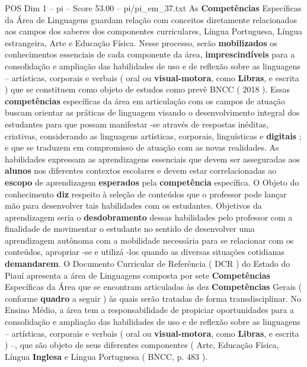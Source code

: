 \begin{textsample}{POS Dim 1 – pi – Score 53.00 – pi/pi\_em\_37.txt}
As \textbf{Competências} Específicas da Área de Linguagens guardam relação com conceitos diretamente relacionados aos campos dos saberes dos componentes curriculares, Língua Portuguesa, Língua estrangeira, Arte e Educação Física.
Nesse processo, serão \textbf{mobilizados} os conhecimentos essenciais de cada componente da área, \textbf{imprescindíveis} para a consolidação e ampliação das habilidades de uso e de reflexão sobre as linguagens – artísticas, corporais e verbais ( oral ou \textbf{visual-motora}, como \textbf{Libras}, e escrita ) que se constituem como objeto de estudos como prevê BNCC ( 2018 ).
Essas \textbf{competências} específicas da área em articulação com os campos de atuação buscam orientar as práticas de linguagem visando o desenvolvimento integral dos estudantes para que possam manifestar -se através de respostas inéditas, criativas, considerando as linguagens artísticas, corporais, linguísticas e \textbf{digitais} ; e que se traduzem em compromisso de atuação com as novas realidades.
As habilidades expressam as aprendizagens essenciais que devem ser asseguradas aos \textbf{alunos} nos diferentes contextos escolares e devem estar correlacionadas ao \textbf{escopo} de aprendizagem \textbf{esperados} pela \textbf{competência} específica.
O Objeto do conhecimento \textbf{diz} respeito à seleção de conteúdos que o professor pode lançar mão para desenvolver tais habilidades com os estudantes.
Objetivos da aprendizagem seria o \textbf{desdobramento} dessas habilidades pelo professor com a finalidade de movimentar o estudante no sentido de desenvolver uma aprendizagem autônoma com a mobilidade necessária para se relacionar com os conteúdos, apropriar -se e utilizá -los quando as diversas situações cotidianas \textbf{demandarem}.
O Documento Curricular de Referência ( DCR ) do Estado do Piauí apresenta a área de Linguagens composta por sete \textbf{Competências} Específicas da Área que se encontram articuladas às dez \textbf{Competências} Gerais ( conforme \textbf{quadro} a seguir ) às quais serão tratadas de forma transdisciplinar.
No Ensino Médio, a área tem a responsabilidade de propiciar oportunidades para a consolidação e ampliação das habilidades de uso e de reflexão sobre as linguagens – artísticas, corporais e verbais ( oral ou \textbf{visual-motora}, como \textbf{Libras}, e escrita ) –, que são objeto de seus diferentes componentes ( Arte, Educação Física, Língua \textbf{Inglesa} e Língua Portuguesa ( BNCC, p. 483 ).

\end{textsample}

